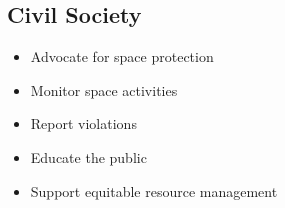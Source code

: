 \subsection{Civil Society}

\begin{itemize}
    \item Advocate for space protection
    \item Monitor space activities
    \item Report violations
    \item Educate the public
    \item Support equitable resource management
\end{itemize}

\cleardoublepage
